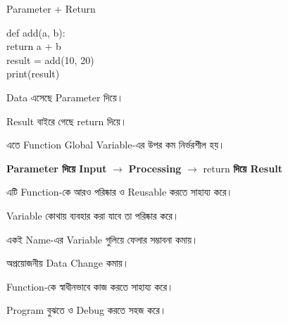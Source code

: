 \begin{codeoutputbox}{Parameter + Return}

\noindent
\begin{minipage}[t]{0.52\linewidth}
\codeheading

\begin{english}
\ttfamily
def add(a, b):\\
\hspace*{4mm}return a + b\\[0.5mm]
result = add(10, 20)\\
print(result)
\end{english}

\end{minipage}
\hfill
\begin{minipage}[t]{0.44\linewidth}
\outputheading

\begin{center}
\textenglish{}
\end{center}

Data এসেছে Parameter দিয়ে।

Result বাইরে গেছে
\textenglish{\ttfamily return}
দিয়ে।

এতে Function Global Variable-এর উপর কম নির্ভরশীল হয়।

\end{minipage}

\end{codeoutputbox}

\begin{rememberbox}

\begin{center}

\textbf{Parameter দিয়ে Input}
\(\longrightarrow\)
\textbf{Processing}
\(\longrightarrow\)
\textenglish{\ttfamily return}
\textbf{ দিয়ে Result}

\end{center}

এটি Function-কে আরও পরিষ্কার ও Reusable করতে সাহায্য করে।

\end{rememberbox}



\begin{compacttwocolpoints}

\item Variable কোথায় ব্যবহার করা যাবে তা পরিষ্কার করে।

\item একই Name-এর Variable গুলিয়ে ফেলার সম্ভাবনা কমায়।

\item অপ্রয়োজনীয় Data Change কমায়।

\item Function-কে স্বাধীনভাবে কাজ করতে সাহায্য করে।

\item Program বুঝতে ও Debug করতে সহজ করে।

\end{compacttwocolpoints}


